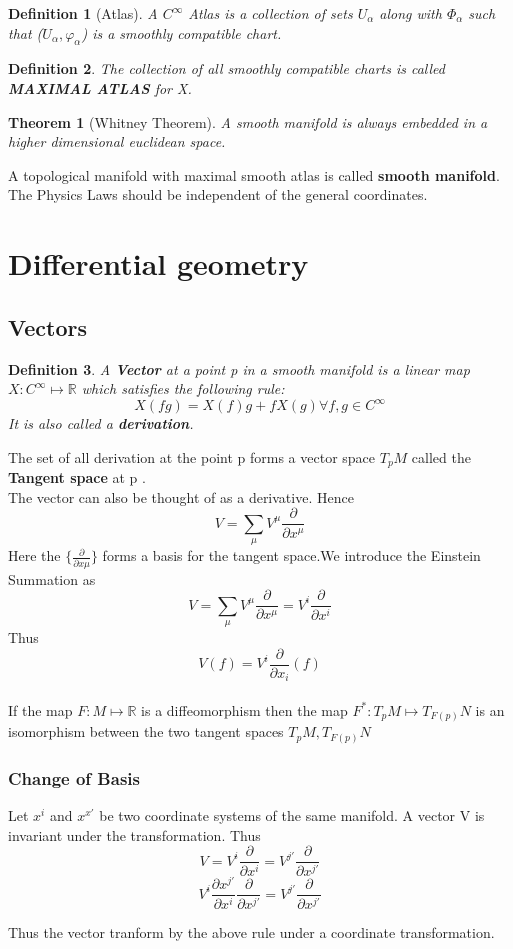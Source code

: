 \documentclass{article}
\newtheorem{theorem}{Theorem}[section]
\newtheorem{defn}{Definition}[section]
\begin{document}
\begin{defn}[Atlas]
    A $C^{\infty}$ Atlas is a collection of sets $U_{\alpha}$ along with $\varPhi_{\alpha} $ such that ($U_\alpha,\varphi_\alpha$) is a smoothly compatible chart.
\end{defn}
\begin{defn}
The collection of all smoothly compatible charts is called \textbf{MAXIMAL ATLAS} for X. 

\end{defn} 

\begin{theorem}[Whitney Theorem]
    A smooth manifold is always embedded in a higher dimensional euclidean space.
    
\end{theorem}

 A topological manifold with maximal smooth atlas is called \textbf{smooth manifold}.
\\
The Physics Laws should be independent of the general coordinates.
\section{Differential geometry}
\subsection{Vectors}
\begin{defn}
    A \textbf{Vector} at a point p in a smooth manifold is a linear map $X: C^{\infty} \mapsto \mathbb{R}$ which satisfies the following rule:$$X(fg)=X(f)g +fX(g)  \forall f,g \in C^{\infty}$$ It is also called a \textbf{derivation}.
\end{defn}
The set of all derivation at the point p forms a vector space $T_p M$ called the \textbf{Tangent space} at p .
\\
The vector can also be thought of as a derivative. Hence $$V = \sum_{\mu} V^{\mu} \frac{\partial}{\partial x^{\mu}}   $$ Here the $\{\frac{\partial}{\partial x{\mu}} \}$ forms a basis for the tangent space.We introduce the Einstein Summation as $$V = \sum_{\mu} V^{\mu} \frac{\partial}{\partial x^{\mu}} = V^i\frac{\partial}{\partial x^{i}}$$  Thus $$V(f) = V^i\frac{\partial}{\partial x_{i}} (f)$$
\\
If the map $F : M \mapsto \mathbb{R}$ is a diffeomorphism then the map $F^* : T_p M \mapsto T_{F(p)} N$ is an isomorphism between the two tangent spaces $T_pM , T_{F(p)} N$ 

\subsubsection{Change of Basis}
Let $x^i$ and $x^{x'}$ be two coordinate systems of the same manifold. A vector V is invariant under the transformation. Thus $$V = V^i \frac{\partial}{\partial x^{i}} = V^{j'} \frac{\partial}{\partial x^{j'}} $$
$$V^i \frac{\partial x^{j'}}{\partial x^{i}} \frac{\partial}{\partial x^{j'}} = V^{j'} \frac{\partial}{\partial x^{j'}} $$ 
\begin{center}
\end{center}
Thus the vector tranform by the above rule under a coordinate transformation.
\end{document}
